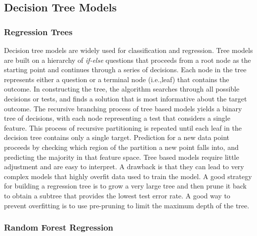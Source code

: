 \documentclass[sigconf]{acmart}
\begin{document}

\subsection{Decision Tree Models}

\subsubsection{Regression Trees}
Decision tree models are widely used for classification and regression. Tree 
models are built on a hierarchy of \textit{if-else} questions that proceeds 
from a root node as the starting point and continues through a series of 
decisions. Each node in the tree represents either a question or a terminal 
node (i.e.,leaf) that contains the outcome. In constructing the tree, the 
algorithm searches through all possible decisions or tests, and finds a 
solution that is most informative about the target outcome. The recursive 
branching process of tree based models yields a binary tree of decisions, 
with each node representing a test that considers a single feature. This 
process of recursive partitioning is repeated until each leaf in the decision 
tree contains only a single target. Prediction for a new data point proceeds 
by checking which region of the partition a new point falls into, and 
predicting the majority in that feature space. Tree based models require 
little adjustment and are easy to interpret. A drawback is that they can lead 
to very complex models that highly overfit data used to train the model. A 
good strategy for building a regression tree is to grow a very large tree 
and then prune it back to obtain a subtree that provides the lowest test error 
rate. A good way to prevent overfitting is to use pre-pruning to limit 
the maximum depth of the tree. 

\subsubsection{Random Forest Regression}
\end{document}
